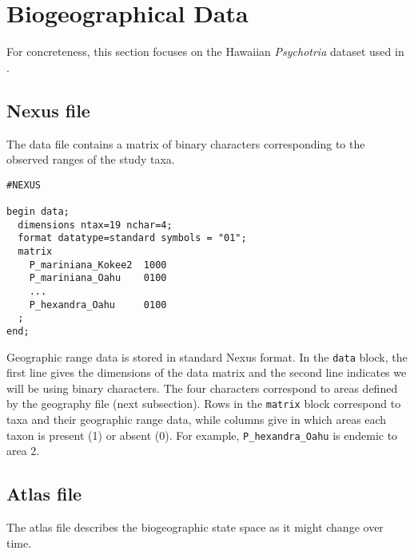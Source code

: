 \section{Biogeographical Data}

For concreteness, this section focuses on the Hawaiian {\it Psychotria} dataset used in \citet{Ree2008}.

\subsection{Nexus file}

The data file contains a matrix of binary characters corresponding to the observed ranges of the study taxa.

\begin{framed}
\begin{lstlisting}
#NEXUS

begin data;
  dimensions ntax=19 nchar=4;
  format datatype=standard symbols = "01";
  matrix
    P_mariniana_Kokee2  1000
    P_mariniana_Oahu    0100
    ...
    P_hexandra_Oahu     0100
  ;
end;
\end{lstlisting}
\end{framed}

Geographic range data is stored in standard Nexus format.
In the {\tt data} block, the first line gives the dimensions of the data matrix and the second line indicates we will be using binary characters.
The four characters correspond to areas defined by the geography file (next subsection).
Rows in the {\tt matrix} block correspond to taxa and their geographic range data, while columns give in which areas each taxon is present (1) or absent (0).
For example, {\tt P\_hexandra\_Oahu} is endemic to area 2.

\subsection{Atlas file}

The atlas file describes the biogeographic state space as it might change over time.

